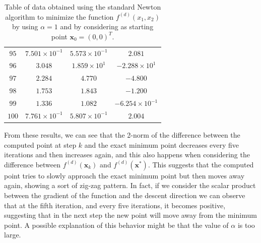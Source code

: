 \documentclass[a4paper,11pt]{article}
\begin{document}
\begin{table}[H]
\begin{tabular}{|c|c|c|c|}
		$95$ & $7.501\times10^{-1}$ & $5.573\times10^{-1}$ & $2.081$ \\
		$96$ & $3.048$ & $1.859\times10^{1}$ & $-2.288\times10^{1}$ \\
		$97$ & $2.284$ & $4.770$ & $-4.800$ \\
		$98$ & $1.753$ & $1.843$ & $-1.200$ \\
		$99$ & $1.336$ & $1.082$ & $-6.254\times10^{-1}$ \\
		$100$ & $7.761\times10^{-1}$ & $5.807\times10^{-1}$ & $2.004$ \\
		\hline
	\end{tabular}
	\caption{Table of data obtained using the standard Newton algorithm to minimize the function $f^{(d)}(x_{1},x_{2})$ by using $\alpha=1$ and by considering as starting point $\textbf{x}_{0}=(0,0)^{T}$.}
	\label{tab:func_d_x0_2}
\end{table}
\noindent From these results, we can see that the 2-norm of the difference between the computed point at step $k$ and the exact minimum point decreases every five iterations and then increases again, and this also happens when considering the difference between $f^{(d)}(\textbf{x}_{k})$ and  $f^{(d)}(\textbf{x}^*)$. This suggests that the computed point tries to slowly approach the exact minimum point but then moves away again, showing a sort of zig-zag pattern. In fact, if we consider the scalar product between the gradient of the function and the descent direction we can observe that at the fifth iteration, and every five iterations, it becomes positive, suggesting that in the next step the new point will move away from the minimum point. A possible explanation of this behavior might be that the value of $\alpha$ is too large.\\
\end{document}
